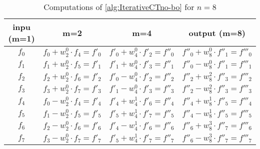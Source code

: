 \bgroup
\def\arraystretch{1.5}
\begin{table}[htpb]
    \caption[]{Computations of \cref{alg:IterativeCTno-bo} for $n=8$}\label{tab:computation_ct-no-bo}
    \centering
    \begin{tabular}{c|c|c|c}
      \toprule
        inpu (m=1) & m=2 & m=4 & output (m=8) \\
      \midrule
        $f_0$ & 
        $f_0 + w_2^0 \cdot f_4 = f'_0$ & 
        $f'_0 + w_4^0 \cdot f'_2 = f''_0$ & 
        $f''_0 + w_8^0 \cdot f''_1 = f'''_0$ \\

        $f_1$ & 
        $f_1 + w_2^0 \cdot f_5 = f'_1$ & 
        $f'_1 + w_4^0 \cdot f'_3 = f''_1$ & 
        $f''_0 - w_8^0 \cdot f''_1 = f'''_1$ \\

        $f_2$ & 
        $f_2 + w_2^0 \cdot f_6 = f'_2$ & 
        $f'_0 - w_4^0 \cdot f'_2 = f''_2$ &
        $f''_2 + w_8^2 \cdot f''_3 = f'''_2$  \\

        $f_3$ & 
        $f_3 + w_2^0 \cdot f_7 = f'_3$ & 
        $f'_1 - w_4^0 \cdot f'_3 = f''_3$ & 
        $f''_2 - w_8^2 \cdot f''_3 = f'''_3$ \\

        $f_4$ & 
        $f_0 - w_2^0 \cdot f_4 = f'_4$ & 
        $f'_4 + w_4^1 \cdot f'_6 = f''_4$ & 
        $f''_4 + w_8^1 \cdot f''_5 = f'''_4$ \\

        $f_5$ & 
        $f_1 - w_2^0 \cdot f_5 = f'_5$ & 
        $f'_5 + w_4^1 \cdot f'_7 = f''_5$ & 
        $f''_4 - w_8^1 \cdot f''_5 = f'''_5$ \\

        $f_6$ & 
        $f_2 - w_2^0 \cdot f_6 = f'_6$ & 
        $f'_4 - w_4^1 \cdot f'_6 = f''_6$ & 
        $f''_6 + w_8^3 \cdot f''_7 = f'''_6$ \\

        $f_7$ & 
        $f_3 - w_2^0 \cdot f_7 = f'_7$ & 
        $f'_5 + w_4^1 \cdot f'_7 = f''_7$ & 
        $f''_6 - w_8^3 \cdot f''_7 = f'''_7$ \\
      \bottomrule
    \end{tabular}
  \end{table}
\egroup

